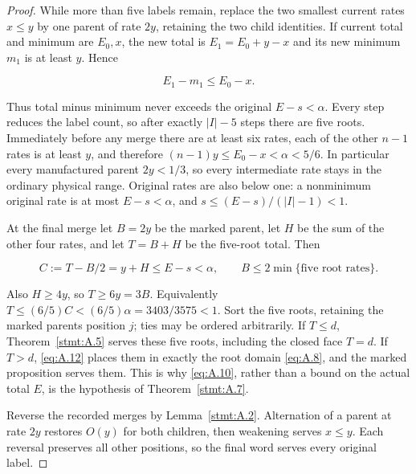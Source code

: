 \documentclass[11pt,a4paper]{article}
\begin{document}
\begin{proof}

 While more than five labels remain, replace the two smallest current rates \(x\le y\) by one parent of rate \(2y\), retaining the two child identities. If current total and minimum are \(E_0,x\), the new total is \(E_1=E_0+y-x\) and its new minimum \(m_1\) is at least \(y\). Hence

\begin{equation}
E_1-m_1\le E_0-x.
\tag{A.11}\label{eq:A.11}
\end{equation}

Thus total minus minimum never exceeds the original \(E-s<\alpha\). Every step reduces the label count, so after exactly \(|I|-5\) steps there are five roots. Immediately before any merge there are at least six rates, each of the other \(n-1\) rates is at least \(y\), and therefore \((n-1)y\le E_0-x<\alpha<5/6\). In particular every manufactured parent \(2y<1/3\), so every intermediate rate stays in the ordinary physical range. Original rates are also below one: a nonminimum original rate is at most \(E-s<\alpha\), and \(s\le(E-s)/(|I|-1)<1\).

At the final merge let \(B=2y\) be the marked parent, let \(H\) be the sum of the other four rates, and let \(T=B+H\) be the five-root total. Then

\begin{equation}
C:=T-B/2=y+H\le E-s<\alpha,\qquad
B\le2\min\{\text{five root rates}\}.
\tag{A.12}\label{eq:A.12}
\end{equation}

Also \(H\ge4y\), so \(T\ge6y=3B\). Equivalently \(T\le(6/5)C<(6/5)\alpha=3403/3575<1\). Sort the five roots, retaining the marked parent\textquotesingle s position \(j\); ties may be ordered arbitrarily. If \(T\le d\), Theorem~\ref{stmt:A.5} serves these five roots, including the closed face \(T=d\). If \(T>d\), \eqref{eq:A.12} places them in exactly the root domain \eqref{eq:A.8}, and the marked proposition serves them. This is why \eqref{eq:A.10}, rather than a bound on the actual total \(E\), is the hypothesis of Theorem~\ref{stmt:A.7}.

Reverse the recorded merges by Lemma~\ref{stmt:A.2}. Alternation of a parent at rate \(2y\) restores \(O(y)\) for both children, then weakening serves \(x\le y\). Each reversal preserves all other positions, so the final word serves every original label. 

\end{proof}
\end{document}
